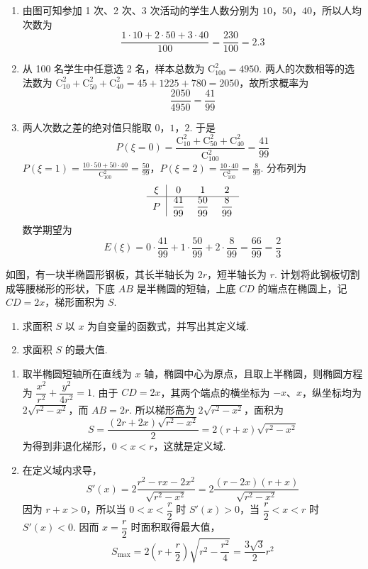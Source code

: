 \begin{solution}
\begin{enumerate}
\item 由图可知参加 1 次、2 次、3 次活动的学生人数分别为 \(10\)，\(50\)，\(40\)，所以人均次数为
\[
\frac{1\cdot10+2\cdot50+3\cdot40}{100}=\frac{230}{100}=2.3
\]
\item 从 100 名学生中任意选 2 名，样本总数为 \(\mathrm C_{100}^{2}=4950\). 两人的次数相等的选法数为
\(\mathrm C_{10}^{2}+\mathrm C_{50}^{2}+\mathrm C_{40}^{2}=45+1225+780=2050\)，故所求概率为
\[
\frac{2050}{4950}=\frac{41}{99}
\]
\item 两人次数之差的绝对值只能取 \(0\)，\(1\)，\(2\). 于是
\[
P(\xi=0)=\frac{\mathrm C_{10}^{2}+\mathrm C_{50}^{2}+\mathrm C_{40}^{2}}{\mathrm C_{100}^{2}}=\frac{41}{99}
\]
\(P(\xi=1)=\frac{10\cdot50+50\cdot40}{\mathrm C_{100}^{2}}=\frac{50}{99}\)，\(P(\xi=2)=\frac{10\cdot40}{\mathrm C_{100}^{2}}=\frac8{99}\).
分布列为
\[
\begin{tabular}{c|ccc}
\(\xi\)&\(0\)&\(1\)&\(2\)\\ \hline
\(P\)&\(\dfrac{41}{99}\)&\(\dfrac{50}{99}\)&\(\dfrac8{99}\)
\end{tabular}
\]
数学期望为
\[
E(\xi)=0\cdot\frac{41}{99}+1\cdot\frac{50}{99}+2\cdot\frac8{99}=\frac{66}{99}=\frac23
\]
\end{enumerate}
\end{solution}

\begin{problem}
如图，有一块半椭圆形钢板，其长半轴长为 \(2r\)，短半轴长为 \(r\). 计划将此钢板切割成等腰梯形的形状，下底 \(AB\) 是半椭圆的短轴，上底 \(CD\) 的端点在椭圆上，记 \(CD = 2x\)，梯形面积为 \(S\).

\begin{enumerate}
\item 求面积 \(S\) 以 \(x\) 为自变量的函数式，并写出其定义域.
\item 求面积 \(S\) 的最大值.
\end{enumerate}

\end{problem}

\begin{solution}
\begin{enumerate}
\item 取半椭圆短轴所在直线为 \(x\) 轴，椭圆中心为原点，且取上半椭圆，则椭圆方程为
\(\dfrac{x^2}{r^2}+\dfrac{y^2}{4r^2}=1\). 由于 \(CD=2x\)，其两个端点的横坐标为 \(-x\)、\(x\)，纵坐标均为 \(2\sqrt{r^2-x^2}\)，而 \(AB=2r\). 所以梯形高为 \(2\sqrt{r^2-x^2}\)，面积为
\[
S=\frac{(2r+2x)\sqrt{r^2-x^2}}2=2(r+x)\sqrt{r^2-x^2}
\]
为得到非退化梯形，\(0<x<r\)，这就是定义域.
\item 在定义域内求导，
\[
S'(x)=2\frac{r^2-rx-2x^2}{\sqrt{r^2-x^2}}
=2\frac{(r-2x)(r+x)}{\sqrt{r^2-x^2}}
\]
因为 \(r+x>0\)，所以当 \(0<x<\dfrac r2\) 时 \(S'(x)>0\)，当 \(\dfrac r2<x<r\) 时 \(S'(x)<0\). 因而 \(x=\dfrac r2\) 时面积取得最大值，
\[
S_{\max}=2\left(r+\frac r2\right)\sqrt{r^2-\frac{r^2}{4}}
=\frac{3\sqrt3}{2}r^2
\]
\end{enumerate}
\end{solution}


